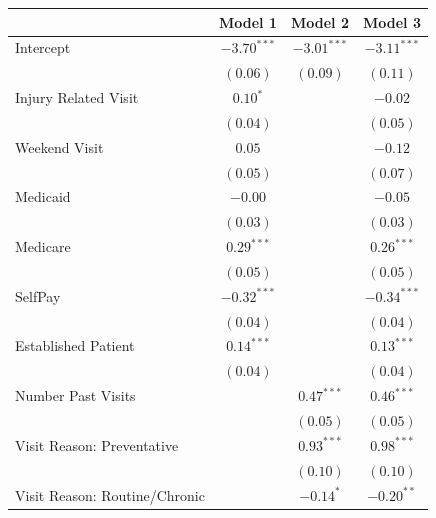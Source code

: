 \documentclass[12pt,twoside]{reedthesis}
\begin{document}
  \begin{table}
  \begin{center}
  \begin{small}
  \begin{tabular}{l c c c }
  \hline
   & Model 1 & Model 2 & Model 3 \\
  \hline
  Intercept                     & $-3.70^{***}$ & $-3.01^{***}$ & $-3.11^{***}$ \\
                                & $(0.06)$      & $(0.09)$      & $(0.11)$      \\
  Injury Related Visit          & $0.10^{*}$    &               & $-0.02$       \\
                                & $(0.04)$      &               & $(0.05)$      \\
  Weekend Visit                 & $0.05$        &               & $-0.12$       \\
                                & $(0.05)$      &               & $(0.07)$      \\
  Medicaid                      & $-0.00$       &               & $-0.05$       \\
                                & $(0.03)$      &               & $(0.03)$      \\
  Medicare                      & $0.29^{***}$  &               & $0.26^{***}$  \\
                                & $(0.05)$      &               & $(0.05)$      \\
  SelfPay                       & $-0.32^{***}$ &               & $-0.34^{***}$ \\
                                & $(0.04)$      &               & $(0.04)$      \\
  Established Patient           & $0.14^{***}$  &               & $0.13^{***}$  \\
                                & $(0.04)$      &               & $(0.04)$      \\
  Number Past Visits            &               & $0.47^{***}$  & $0.46^{***}$  \\
                                &               & $(0.05)$      & $(0.05)$      \\
  Visit Reason: Preventative    &               & $0.93^{***}$  & $0.98^{***}$  \\
                                &               & $(0.10)$      & $(0.10)$      \\
  Visit Reason: Routine/Chronic &               & $-0.14^{*}$   & $-0.20^{**}$  \\

\end{tabular}
\end{small}
\end{center}
\end{table}
\end{document}
